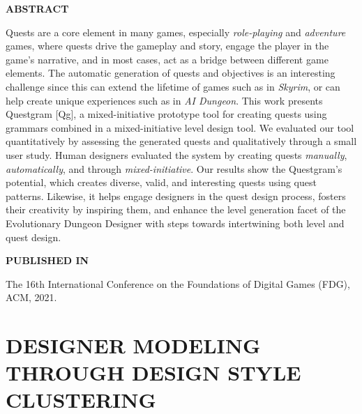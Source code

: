 \graphicspath{{included-papers-tex/paper-6/}}



\normalfont
\textbf{\textsc{ABSTRACT}}

Quests are a core element in many games, especially \emph{role-playing} and \emph{adventure} games, where quests drive the gameplay and story, engage the player in the game’s narrative, and in most cases, act as a bridge between different game elements. The automatic generation of quests and objectives is an interesting challenge since this can extend the lifetime of games such as in \emph{Skyrim}, or can help create unique experiences such as in \emph{AI Dungeon}. This work presents Questgram [Qg], a mixed-initiative prototype tool for creating quests using grammars combined in a mixed-initiative level design tool. We evaluated our tool quantitatively by assessing the generated quests and qualitatively through a small user study. Human designers evaluated the system by creating quests \emph{manually}, \emph{automatically}, and through \emph{mixed-initiative}. Our results show the Questgram's potential, which creates diverse, valid, and interesting quests using quest patterns. Likewise, it helps engage designers in the quest design process, fosters their creativity by inspiring them, and enhance the level generation facet of the Evolutionary Dungeon Designer with steps towards intertwining both level and quest design.

\textbf{\textsc{PUBLISHED IN}}

The 16th International Conference on the Foundations of Digital Games (FDG), ACM, 2021.

\section*{DESIGNER MODELING THROUGH DESIGN STYLE CLUSTERING}




% 

% 


